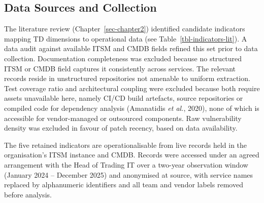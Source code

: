 \documentclass[
  12pt,
  letterpaper,
  12pt,
  oneside,
  english,
  onehalfspacing,
  headsepline]{MastersDoctoralThesis}
\begin{document}
\subsection{Data Sources and Collection}\label{sec-datasources}

The literature review (Chapter~\ref{sec-chapter2}) identified candidate
indicators mapping TD dimensions to operational data (see
Table~\ref{tbl-indicators-lit}). A data audit against available ITSM and
CMDB fields refined this set prior to data collection. Documentation
completeness was excluded because no structured ITSM or CMDB field
captures it consistently across services. The relevant records reside in
unstructured repositories not amenable to uniform extraction. Test
coverage ratio and architectural coupling were excluded because both
require assets unavailable here, namely CI/CD build artefacts, source
repositories or compiled code for dependency analysis (Amanatidis
\emph{et al.}, 2020), none of which is accessible for vendor-managed or
outsourced components. Raw vulnerability density was excluded in favour
of patch recency, based on data availability.

The five retained indicators are operationalisable from live records
held in the organisation's ITSM instance and CMDB. Records were accessed
under an agreed arrangement with the Head of Trading IT over a two-year
observation window (January 2024 -- December 2025) and anonymised at
source, with service names replaced by alphanumeric identifiers and all
team and vendor labels removed before analysis.
\end{document}
